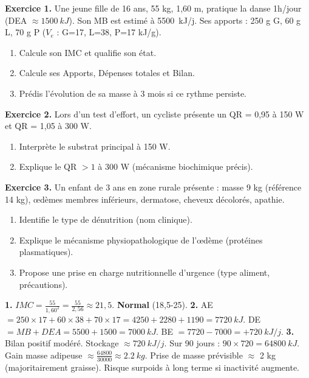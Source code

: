 \documentclass[11pt]{article}
\begin{document}
\begin{exercice}
\textbf{Exercice 1.} Une jeune fille de 16 ans, 55 kg, 1,60 m, pratique la danse 1h/jour (DEA $\approx \SI{1500}{kJ}$). Son MB est estimé à \SI{5500}{kJ/j}. Ses apports : 250 g G, 60 g L, 70 g P ($V_e$ : G=17, L=38, P=17 kJ/g).
\begin{enumerate}
\item Calcule son IMC et qualifie son état.
\item Calcule ses Apports, Dépenses totales et Bilan.
\item Prédis l'évolution de sa masse à 3 mois si ce rythme persiste.
\end{enumerate}

\textbf{Exercice 2.} Lors d'un test d'effort, un cycliste présente un QR = 0,95 à 150 W et QR = 1,05 à 300 W.
\begin{enumerate}
\item Interprète le substrat principal à 150 W.
\item Explique le QR $> 1$ à 300 W (mécanisme biochimique précis).
\end{enumerate}

\textbf{Exercice 3.} Un enfant de 3 ans en zone rurale présente : masse 9 kg (référence 14 kg), œdèmes membres inférieurs, dermatose, cheveux décolorés, apathie.
\begin{enumerate}
\item Identifie le type de dénutrition (nom clinique).
\item Explique le mécanisme physiopathologique de l'œdème (protéines plasmatiques).
\item Propose une prise en charge nutritionnelle d'urgence (type aliment, précautions).
\end{enumerate}
\end{exercice}

\begin{corrige}[Exercice 1]
\textbf{1.} $IMC = \frac{55}{1,60^2} = \frac{55}{2,56} \approx 21,5$. \textbf{Normal} (18,5-25).
\textbf{2.} AE $= 250\times17 + 60\times38 + 70\times17 = 4250 + 2280 + 1190 = \SI{7720}{kJ}$.
DE $= MB + DEA = 5500 + 1500 = \SI{7000}{kJ}$.
BE $= 7720 - 7000 = +\SI{720}{kJ/j}$.
\textbf{3.} Bilan positif modéré. Stockage $\approx \SI{720}{kJ/j}$. Sur 90 jours : $90 \times 720 = \SI{64800}{kJ}$. Gain masse adipeuse $\approx \frac{64800}{30000} \approx \SI{2,2}{kg}$. Prise de masse prévisible $\approx$ 2 kg (majoritairement graisse). Risque surpoids à long terme si inactivité augmente.
\end{corrige}
\end{document}
